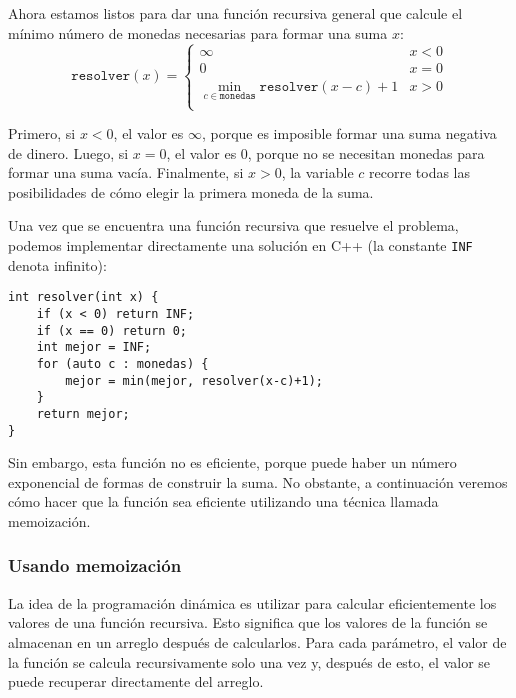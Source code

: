 Ahora estamos listos para dar una función recursiva general
que calcule el mínimo número de
monedas necesarias para formar una suma $x$:
\begin{equation*}
    \texttt{resolver}(x) = \begin{cases}
               \infty               & x < 0\\
               0               & x = 0\\
               \min_{c \in \texttt{monedas}} \texttt{resolver}(x-c)+1 & x > 0 \\
           \end{cases}
\end{equation*}

Primero, si $x<0$, el valor es $\infty$,
porque es imposible formar una suma
negativa de dinero.
Luego, si $x=0$, el valor es $0$,
porque no se necesitan monedas para formar una suma vacía.
Finalmente, si $x>0$, la variable $c$ recorre
todas las posibilidades de cómo elegir la primera moneda
de la suma.

Una vez que se encuentra una función recursiva que resuelve el problema,
podemos implementar directamente una solución en C++
(la constante \texttt{INF} denota infinito):

\begin{lstlisting}
int resolver(int x) {
    if (x < 0) return INF;
    if (x == 0) return 0;
    int mejor = INF;
    for (auto c : monedas) {
        mejor = min(mejor, resolver(x-c)+1);
    }
    return mejor;
}
\end{lstlisting}

Sin embargo, esta función no es eficiente,
porque puede haber un número exponencial de formas
de construir la suma.
No obstante, a continuación veremos cómo hacer que la
función sea eficiente utilizando una técnica llamada memoización.

\subsubsection{Usando memoización}


La idea de la programación dinámica es utilizar
 para calcular eficientemente
los valores de una función recursiva.
Esto significa que los valores de la función
se almacenan en un arreglo después de calcularlos.
Para cada parámetro, el valor de la función
se calcula recursivamente solo una vez y, después de esto,
el valor se puede recuperar directamente del arreglo.

